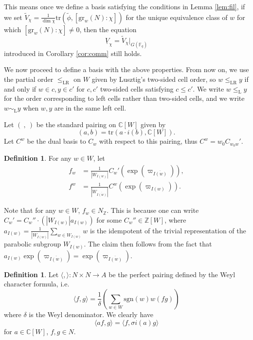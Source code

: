 \documentclass{amsart}
\theoremstyle{definition}
\newtheorem{defn}[thm]{Definition}
\newcommand{\Ce}{\mathbb{C}}
\begin{document}
This means once we define a basis satisfying the conditions in Lemma \ref{lem:fil}, if we set $\tilde V_\chi=\frac{1}{\dim \chi}\mathrm{tr}(\tilde \phi,  [\mathrm{gr}_w(N):\chi])$ for the unique equivalence class of $w$ for which $[\mathrm{gr}_w(N):\chi]\ne 0$, then the equation
\begin{equation}
    \underline{V}_\chi = \tilde{V}_{\chi}|_{G(\mathbb{F}_q)}
\end{equation}
introduced in Corollary \ref{cor:comm} still holds.
 
We now proceed to define a basis with the above properties. From now on, we use the partial order $\leq_{\mathrm{LR}}$ on $W$ given by Lusztig's two-sided cell order, so $w \leq_{\mathrm{LR}} y$ if and only if $w \in c, y \in c'$ for $c, c'$ two-sided cells satisfying $c \leq c'$. We write $w \leq_{\mathrm{L}} y$ for the order corresponding to left cells rather than two-sided cells, and we write $w \sim_\mathrm{L} y$ when $w, y$ are in the same left cell.

Let $(\ ,\ )$  be the standard pairing on $\Ce[W]$ given by \[(a,b)=\mathrm{tr}(a\cdot i(b), \Ce[W]).\] Let $C^w$ be the dual basis to $C_w$ with respect to this pairing,
thus $C^w=w_0 C_{w_0w}'$. 
\begin{defn}\label{def:basis}
For any $w \in W$, let
\begin{align*}
    f_w & =\frac{1}{|W_{I(w)}|}C_w' (\exp(\varpi_{\overline{I(w)}})),\\
    f^w & =\frac{1}{|W_{\overline{I(w)}}|} C^w(\exp(\varpi_{I(w)})).
\end{align*}
\end{defn}
Note that for any $w \in W$, $f_w \in N_\mathbb{Z}$. This is because one can write $C_w' = C_w''\cdot (|W_{I(w)}|a_{I(w)})$ for some $C_w'' \in \mathbb{Z}[W]$, where $a_{I(w)} = \frac{1}{|W_{I(w)}|}\sum_{w \in W_{I(w)}} w$ is the idempotent of the trivial representation of the parabolic subgroup $W_{I(w)}$. The claim then follows from the fact that $a_{I(w)}\exp(\varpi_{\overline{I(w)}}) = \exp(\varpi_{\overline{I(w)}})$.

\begin{defn}
    Let $\langle, \rangle \colon  N\times N\to A$ be the perfect pairing defined by the Weyl character formula, i.e. 
\begin{equation}
    \langle f, g\rangle =\frac{1}{\delta}\left(\sum_{w\in W} \mathrm{sgn}(w) w(fg)\right)
\end{equation}
where $\delta$ is the Weyl denominator. We clearly have
\begin{equation}\label{iot}
\langle af, g\rangle = \langle f, \sigma i(a)g\rangle
\end{equation}
for $a\in \Ce[W]$, $f,g\in N$.
\end{defn}
 
\end{document}
